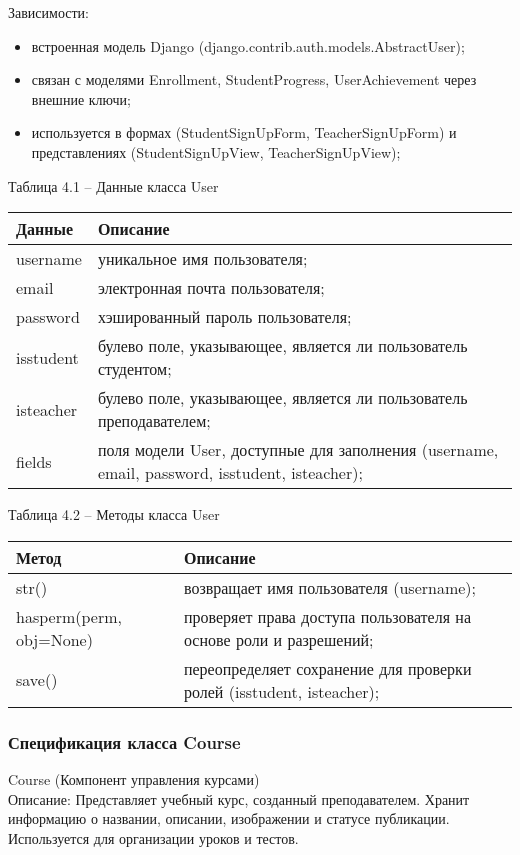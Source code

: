 Зависимости: 
\begin{itemize}
	\item встроенная модель Django (django.contrib.auth.models.AbstractUser); 
	\item связан с моделями Enrollment, StudentProgress, UserAchievement через внешние ключи; 
	\item используется в формах (StudentSignUpForm, TeacherSignUpForm) и представлениях (StudentSignUpView, TeacherSignUpView); 
\end{itemize}

Таблица 4.1 – Данные класса User \\
\begin{tabular}{|p{4cm}|p{8cm}|}
	\hline
	Данные & Описание \\
	\hline
	username & уникальное имя пользователя; \\
	email & электронная почта пользователя; \\
	password & хэшированный пароль пользователя; \\
	isstudent & булево поле, указывающее, является ли пользователь студентом; \\
	isteacher & булево поле, указывающее, является ли пользователь преподавателем; \\
	fields & поля модели User, доступные для заполнения (username, email, password, isstudent, isteacher); \\
	\hline
\end{tabular}

Таблица 4.2 – Методы класса User \\
\begin{tabular}{|p{4cm}|p{8cm}|}
	\hline
	Метод & Описание \\
	\hline
	str() & возвращает имя пользователя (username); \\
	hasperm(perm, obj=None) & проверяет права доступа пользователя на основе роли и разрешений; \\
	save() & переопределяет сохранение для проверки ролей (isstudent, isteacher); \\
	\hline
\end{tabular}

\subsubsection{Спецификация класса Course}
Course (Компонент управления курсами) \\
Описание: Представляет учебный курс, созданный преподавателем. Хранит информацию о названии, описании, изображении и статусе публикации. Используется для организации уроков и тестов.

